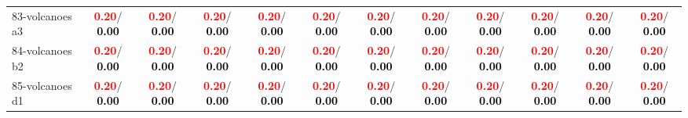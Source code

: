 \begin{table}[h]
\begin{center}
{\begin{tabular}{lc|c|c|c|c|c|c|c|c|c|c}
83-volcanoes a3 & \textcolor{red}{\textbf{  0.20}}/\textcolor{black}{\textbf{  0.00}} & \textcolor{red}{\textbf{  0.20}}/\textcolor{black}{\textbf{  0.00}} & \textcolor{red}{\textbf{  0.20}}/\textcolor{black}{\textbf{  0.00}} & \textcolor{red}{\textbf{  0.20}}/\textcolor{black}{\textbf{  0.00}} & \textcolor{red}{\textbf{  0.20}}/\textcolor{black}{\textbf{  0.00}} & \textcolor{red}{\textbf{  0.20}}/\textcolor{black}{\textbf{  0.00}} & \textcolor{red}{\textbf{  0.20}}/\textcolor{black}{\textbf{  0.00}} & \textcolor{red}{\textbf{  0.20}}/\textcolor{black}{\textbf{  0.00}} & \textcolor{red}{\textbf{  0.20}}/\textcolor{black}{\textbf{  0.00}} & \textcolor{red}{\textbf{  0.20}}/\textcolor{black}{\textbf{  0.00}} & \textcolor{red}{\textbf{  0.20}}/\textcolor{black}{\textbf{  0.00}} \\
84-volcanoes b2 & \textcolor{red}{\textbf{  0.20}}/\textcolor{black}{\textbf{  0.00}} & \textcolor{red}{\textbf{  0.20}}/\textcolor{black}{\textbf{  0.00}} & \textcolor{red}{\textbf{  0.20}}/\textcolor{black}{\textbf{  0.00}} & \textcolor{red}{\textbf{  0.20}}/\textcolor{black}{\textbf{  0.00}} & \textcolor{red}{\textbf{  0.20}}/\textcolor{black}{\textbf{  0.00}} & \textcolor{red}{\textbf{  0.20}}/\textcolor{black}{\textbf{  0.00}} & \textcolor{red}{\textbf{  0.20}}/\textcolor{black}{\textbf{  0.00}} & \textcolor{red}{\textbf{  0.20}}/\textcolor{black}{\textbf{  0.00}} & \textcolor{red}{\textbf{  0.20}}/\textcolor{black}{\textbf{  0.00}} & \textcolor{red}{\textbf{  0.20}}/\textcolor{black}{\textbf{  0.00}} & \textcolor{red}{\textbf{  0.20}}/\textcolor{black}{\textbf{  0.00}} \\
85-volcanoes d1 & \textcolor{red}{\textbf{  0.20}}/\textcolor{black}{\textbf{  0.00}} & \textcolor{red}{\textbf{  0.20}}/\textcolor{black}{\textbf{  0.00}} & \textcolor{red}{\textbf{  0.20}}/\textcolor{black}{\textbf{  0.00}} & \textcolor{red}{\textbf{  0.20}}/\textcolor{black}{\textbf{  0.00}} & \textcolor{red}{\textbf{  0.20}}/\textcolor{black}{\textbf{  0.00}} & \textcolor{red}{\textbf{  0.20}}/\textcolor{black}{\textbf{  0.00}} & \textcolor{red}{\textbf{  0.20}}/\textcolor{black}{\textbf{  0.00}} & \textcolor{red}{\textbf{  0.20}}/\textcolor{black}{\textbf{  0.00}} & \textcolor{red}{\textbf{  0.20}}/\textcolor{black}{\textbf{  0.00}} & \textcolor{red}{\textbf{  0.20}}/\textcolor{black}{\textbf{  0.00}} & \textcolor{red}{\textbf{  0.20}}/\textcolor{black}{\textbf{  0.00}} \\ \hline

\end{tabular}}
\end{center}
\end{table}
